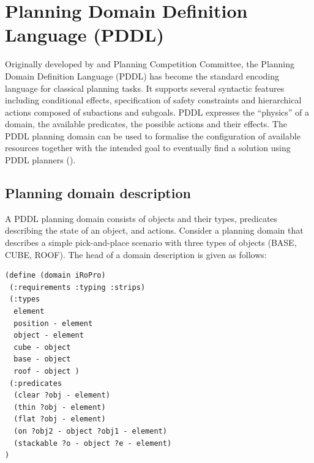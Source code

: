 \section{Planning Domain Definition Language (PDDL)}\label{subsec:PDDL}
Originally developed by \cite{mcdermott1998pddl} and Planning Competition Committee, the Planning Domain Definition Language (PDDL) has become the standard encoding language for classical planning tasks. It supports several syntactic features including conditional effects, specification of safety constraints and hierarchical actions composed of subactions and subgoals. PDDL expresses the ``physics'' of a domain, \ie the available predicates, the possible actions and their effects.
The PDDL planning domain can be used to formalise the configuration of available resources together with the intended goal to eventually find a solution using PDDL planners  (\cite{huckaby2013planning}). 
%

\subsection{Planning domain description}\label{subsec:Planning domain description}
A PDDL planning domain consists of objects and their types, predicates describing the state of an object, and actions. 
Consider a planning domain that describes a simple pick-and-place scenario with three types of objects (BASE, CUBE, ROOF).
The head of a domain description is given as follows:
\begin{verbatim}
(define (domain iRoPro)
 (:requirements :typing :strips)
 (:types 
  element 
  position - element 
  object - element 
  cube - object 
  base - object 
  roof - object )
 (:predicates
  (clear ?obj - element)
  (thin ?obj - element)
  (flat ?obj - element)
  (on ?obj2 - object ?obj1 - element)
  (stackable ?o - object ?e - element) 
)
\end{verbatim}

